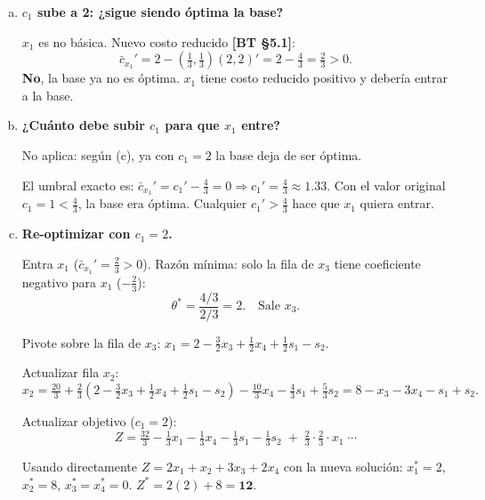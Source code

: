 \documentclass{article}
\begin{document}
\begin{enumerate}[a)]
Diccionario óptimo (invirtiendo $B$):
\begin{align*}
x_2 &= \tfrac{20}{3} + \tfrac{2}{3}x_1 - \tfrac{10}{3}x_4 - \tfrac{4}{3}s_1 + \tfrac{5}{3}s_2 \\
x_3 &= \tfrac{4}{3}  - \tfrac{2}{3}x_1 + \tfrac{1}{3}x_4 + \tfrac{1}{3}s_1 - \tfrac{2}{3}s_2 \\
Z   &= \tfrac{32}{3} - \tfrac{1}{3}x_1 - \tfrac{1}{3}x_4 - \tfrac{1}{3}s_1 - \tfrac{1}{3}s_2
\end{align*}

\item \textbf{$c_1$ sube a 2: ¿sigue siendo óptima la base?}

$x_1$ es no básica. Nuevo costo reducido \textbf{[BT §5.1]}:
\[
  \bar{c}_{x_1}' = 2 - \left(\tfrac{1}{3},\tfrac{1}{3}\right)(2,2)' = 2 - \tfrac{4}{3} = \tfrac{2}{3} > 0.
\]
\textbf{No}, la base ya no es óptima. $x_1$ tiene costo reducido positivo y debería entrar a la base.

\item \textbf{¿Cuánto debe subir $c_1$ para que $x_1$ entre?}

No aplica: según (c), ya con $c_1 = 2$ la base deja de ser óptima.

El umbral exacto es: $\bar{c}_{x_1}' = c_1' - \frac{4}{3} = 0 \Rightarrow c_1' = \frac{4}{3} \approx 1.33$. Con el valor original $c_1 = 1 < \frac{4}{3}$, la base era óptima. Cualquier $c_1' > \frac{4}{3}$ hace que $x_1$ quiera entrar.

\item \textbf{Re-optimizar con $c_1 = 2$.}

Entra $x_1$ ($\bar{c}_{x_1}' = \tfrac{2}{3} > 0$). Razón mínima: solo la fila de $x_3$ tiene coeficiente negativo para $x_1$ ($-\tfrac{2}{3}$):
\[
  \theta^* = \frac{4/3}{2/3} = 2. \quad \text{Sale } x_3.
\]

Pivote sobre la fila de $x_3$: $x_1 = 2 - \tfrac{3}{2}x_3 + \tfrac{1}{2}x_4 + \tfrac{1}{2}s_1 - s_2$.

Actualizar fila $x_2$:
\[
  x_2 = \tfrac{20}{3} + \tfrac{2}{3}\!\left(2 - \tfrac{3}{2}x_3 + \tfrac{1}{2}x_4 + \tfrac{1}{2}s_1 - s_2\right) - \tfrac{10}{3}x_4 - \tfrac{4}{3}s_1 + \tfrac{5}{3}s_2 = 8 - x_3 - 3x_4 - s_1 + s_2.
\]

Actualizar objetivo ($c_1=2$):
\[
  Z = \tfrac{32}{3} - \tfrac{1}{3}x_1 - \tfrac{1}{3}x_4 - \tfrac{1}{3}s_1 - \tfrac{1}{3}s_2\;+\;\tfrac{2}{3}\cdot\tfrac{2}{3}\cdot x_1\;\cdots
\]

Usando directamente $Z = 2x_1 + x_2 + 3x_3 + 2x_4$ con la nueva solución:
$x_1^* = 2$, $x_2^* = 8$, $x_3^*=x_4^*=0$. $Z^* = 2(2)+8 = \mathbf{12}$.


\end{enumerate}
\end{document}
